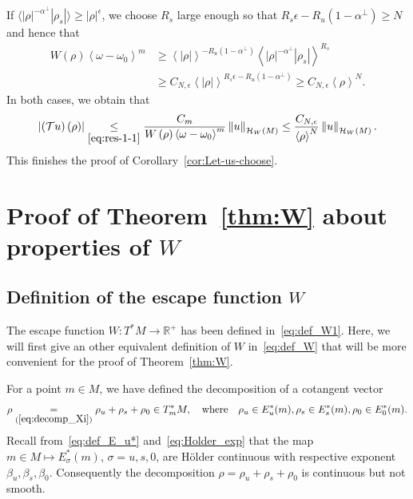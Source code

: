 \documentclass[10pt]{amsart}
\theoremstyle{definition}\newtheorem{defi}[theo]{Definition}\newtheorem{rema}[theo]{Remark}\newtheorem{exam}[theo]{Example}\newtheorem{exem}[theo]{Example}\newtheorem{nota}[theo]{Notation}
\newcommand*\eq[1]{\underset{(#1)}{=}}
\newcommand{\clT}{\mathcal{T}}
\newcommand{\clH}{\mathcal{H}}
\newcommand{\bbR}{\mathbb{R}}
\begin{document}
If $\langle |\rho|^{-\alpha^{\perp}}|\rho_{s}|\rangle \geq|\rho|^{\epsilon}$, we choose $R_{s}$ large enough so that $R_{s}\epsilon-R_{u}(1-\alpha^{\perp})\geq N$ and hence that
\begin{align*}
W\left(\rho\right)\left\langle \omega-\omega_{0}\right\rangle ^{m}&\geq\left\langle \left|\rho\right|\right\rangle ^{-R_{u}\left(1-\alpha^{\perp}\right)}\left\langle \left|\rho\right|^{-\alpha^{\perp}}\left|\rho_{s}\right|\right\rangle ^{R_{s}}\\
&\geq C_{N,\epsilon}\left\langle \left|\rho\right|\right\rangle ^{R_{s}\epsilon-R_{u}\left(1-\alpha^{\perp}\right)}\geq C_{N,\epsilon}\left\langle \rho\right\rangle ^{N}.
\end{align*}
In both cases, we obtain that
\[
\left|\left(\clT u\right)\left(\rho\right)\right|\underset{\eqref{eq:res-1-1}}{\leq}\frac{C_{m}}{W\left(\rho\right)\left\langle \omega-\omega_{0}\right\rangle ^{m}}\left\Vert u\right\Vert _{\clH _{W}\left(M\right)}\leq\frac{C_{N,\epsilon}}{\left\langle \rho\right\rangle ^{N}}\left\Vert u\right\Vert _{\clH _{W}\left(M\right)}.
\]
This finishes the proof of Corollary~\ref{cor:Let-us-choose}.
\clearpage

\appendix

\section{Proof of Theorem~\ref{thm:W} about properties of \texorpdfstring{$W$}{W}}\label{subsec:Proof-of-Thm}

\subsection{Definition of the escape function \texorpdfstring{$W$}{W}}

The escape function $W:T^{*}M\rightarrow\bbR^{+}$ has been defined in~\eqref{eq:def_W1}. Here, we will first give an other equivalent definition of $W$ in~\eqref{eq:def_W} that will be more convenient for the proof of Theorem~\ref{thm:W}.

For a point $m\in M$, we have defined the decomposition of a cotangent vector 
\[
\rho\eq{\ref{eq:decomp_Xi}}\rho_{u}+\rho_{s}+\rho_{0}\in T_{m}^{*}M,\quad\text{where}\quad\rho_{u}\in E_{u}^{*}(m),\rho_{s}\in E_{s}^{*}(m),\rho_{0}\in E_{0}^{*}(m).
\]
Recall from~\eqref{eq:def_E_u*} and~\eqref{eq:Holder_exp} that the map $m\in M\mapsto E_{\sigma}^{*}(m)$, $\sigma=u,s,0$, are H\"older continuous with respective exponent $\beta_{u},\beta_{s},\beta_{0}$. Consequently the decomposition $\rho=\rho_{u}+\rho_{s}+\rho_{0}$ is continuous but not smooth.
\end{document}
